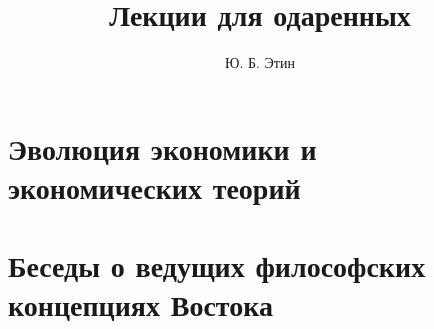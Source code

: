 \documentclass[a4paper,12pt]{book}
\begin{document}
\author{Ю. Б. Этин}
\title{Лекции для одаренных}

\frontmatter
\maketitle
{}
\tableofcontents

\mainmatter
\chapter{Эволюция экономики и экономических теорий}








\chapter{Беседы о ведущих философских концепциях Востока}

\backmatter
\end{document}
